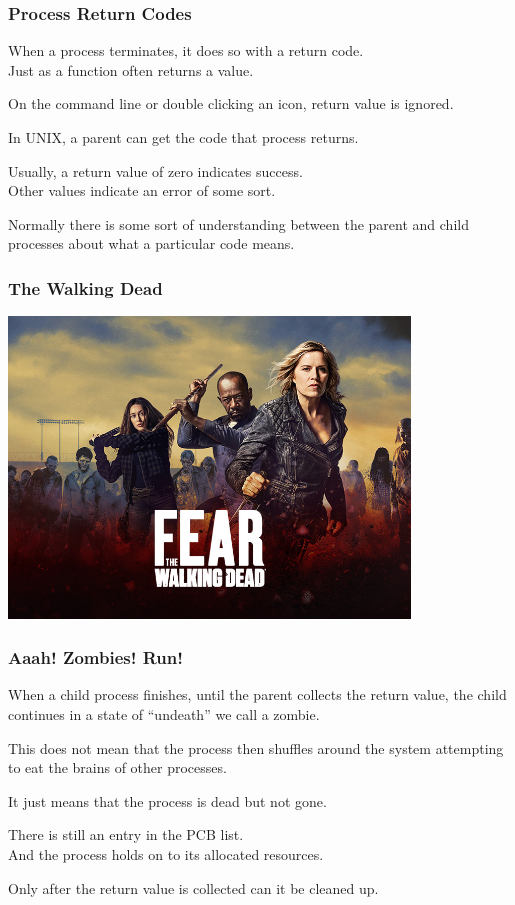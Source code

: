 \begin{frame}
\frametitle{Process Return Codes}

When a process terminates, it does so with a return code.\\
\quad  Just as a function often returns a value. 

On the command line or double clicking an icon, return value is ignored.

In UNIX, a parent can get the code that process returns.

Usually, a return value of zero indicates success.\\
\quad Other values indicate an error of some sort. 

Normally there is some sort of understanding between the parent and child processes about what a particular code means. 

\end{frame}


\begin{frame}
\frametitle{The Walking Dead}

\begin{center}
\includegraphics[width=0.8\textwidth]{images/walking-dead.jpg}
\end{center}

\end{frame}



\begin{frame}
\frametitle{Aaah! Zombies! Run!}

When a child process finishes, until the parent collects the return value, the child continues in a state of ``undeath'' we call a \alert{zombie}.

This does not mean that the process then shuffles around the system attempting to eat the brains of other processes.

It just means that the process is dead but not gone.

There is still an entry in the PCB list.\\
\quad And the process holds on to its allocated resources.

Only after the return value is collected can it be cleaned up. 

\end{frame}

